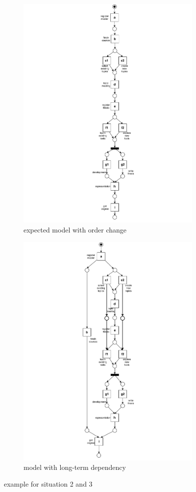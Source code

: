 \begin{figure}[htp]
	\centering
	\begin{subfigure}[b]{0.5\textwidth}
		\centering
		\includegraphics[clip, trim=8cm 0cm 8cm 0cm, width=0.5\linewidth, height=0.7\textheight]{figures/introduction/Master-change-order.pdf}
		\caption{expected model with order change}
		\label{fig:model_c}
	\end{subfigure}%
	\begin{subfigure}[b]{0.5\textwidth}
		\centering
		\includegraphics[clip, trim=7cm 0cm 7cm 0cm, width=0.5\linewidth, height=0.7\textheight]{figures/introduction/Master-with-lt.pdf}
		\caption{model with long-term dependency}
		\label{fig:model_d}
	\end{subfigure}
	\caption{example for situation 2 and 3}
	\label{fig:model_changes_2_3}
\end{figure}
